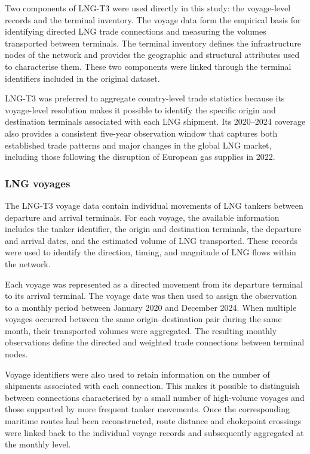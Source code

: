 \documentclass[pdftex,12pt,openright,a4paper,oneside]{book}
\begin{document}
Two components of LNG-T3 were used directly in this study: the voyage-level records and the terminal inventory. The voyage data form the empirical basis for identifying directed LNG trade connections and measuring the volumes transported between terminals. The terminal inventory defines the infrastructure nodes of the network and provides the geographic and structural attributes used to characterise them. These two components were linked through the terminal identifiers included in the original dataset.

LNG-T3 was preferred to aggregate country-level trade statistics because its voyage-level resolution makes it possible to identify the specific origin and destination terminals associated with each LNG shipment. 
Its 2020--2024 coverage also provides a consistent five-year observation window that captures both established trade patterns and major changes in the global LNG market, including those following the disruption of European gas supplies in 2022.

\subsubsection{LNG voyages}
\label{subsubsec:lng_voyages}
The LNG-T3 voyage data contain individual movements of LNG tankers between departure and arrival terminals. For each voyage, the available information includes the tanker identifier, the origin and destination terminals, the departure and arrival dates, and the estimated volume of LNG transported. These records were used to identify the direction, timing, and magnitude of LNG flows within the network.

Each voyage was represented as a directed movement from its departure terminal to its arrival terminal. The voyage date was then used to assign the observation to a monthly period between January 2020 and December 2024. When multiple voyages occurred between the same origin--destination pair during the same month, their transported volumes were aggregated. The resulting monthly observations define the directed and weighted trade connections between terminal nodes.

Voyage identifiers were also used to retain information on the number of shipments associated with each connection. This makes it possible to distinguish between connections characterised by a small number of high-volume voyages and those supported by more frequent tanker movements. Once the corresponding maritime routes had been reconstructed, route distance and chokepoint crossings were linked back to the individual voyage records and subsequently aggregated at the monthly level.
\end{document}
